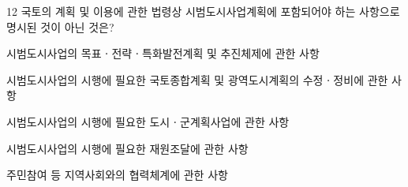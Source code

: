 \begin{question}{12}
국토의 계획 및 이용에 관한 법령상 시범도시사업계획에 포함되어야 하는 사항으로 명시된 것이 아닌 것은?
\begin{choices}
  \item 시범도시사업의 목표ㆍ전략ㆍ특화발전계획 및 추진체제에 관한 사항
  \item 시범도시사업의 시행에 필요한 국토종합계획 및 광역도시계획의 수정ㆍ정비에 관한 사항
  \item 시범도시사업의 시행에 필요한 도시ㆍ군계획사업에 관한 사항
  \item 시범도시사업의 시행에 필요한 재원조달에 관한 사항
  \item 주민참여 등 지역사회와의 협력체계에 관한 사항
\end{choices}
\end{question}
